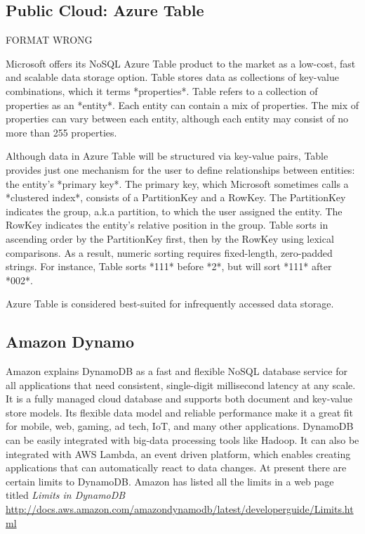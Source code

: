 \subsection{Public Cloud: Azure Table \cv}

     FORMAT WRONG

     Microsoft offers its NoSQL Azure Table product to the market as a
     low-cost, fast and scalable data storage
     option. \cite{www-what-to-use} Table stores data as collections
     of key-value combinations, which it terms *properties*.  Table
     refers to a collection of properties as an *entity*.  Each entity
     can contain a mix of properties.  The mix of properties can vary
     between each entity, although each entity may consist of no more
     than 255 properties. \cite{www-blobqueuetable}

     Although data in Azure Table will be structured via key-value
     pairs, Table provides just one mechanism for the user to define
     relationships between entities: the entity's *primary key*.  The
     primary key, which Microsoft sometimes calls a *clustered index*,
     consists of a PartitionKey and a RowKey.  The PartitionKey
     indicates the group, a.k.a partition, to which the user assigned
     the entity.  The RowKey indicates the entity's relative position
     in the group.  Table sorts in ascending order by the PartitionKey
     first, then by the RowKey using lexical comparisons.  As a
     result, numeric sorting requires fixed-length, zero-padded
     strings.  For instance, Table sorts *111* before *2*, but will
     sort *111* after *002*. \cite{www-scalable-partitioning}

     Azure Table is considered best-suited for infrequently accessed
     data storage.

\subsection{Amazon Dynamo}

     Amazon explains DynamoDB as \cite{www.dyndb} a fast and flexible 
     NoSQL database service for all applications that need consistent, 
     single-digit millisecond latency at any scale. It is a fully managed 
     cloud database and supports both document and key-value store models. 
     Its flexible data model and reliable performance make it a great fit 
     for mobile, web, gaming, ad tech, IoT, and many other applications. 
     DynamoDB can be easily integrated with big-data processing tools like 
     Hadoop. It can also be integrated with AWS Lambda, an event driven platform, 
     which enables creating applications that can automatically react to data 
     changes. At present there are certain limits to DynamoDB. Amazon has listed 
     all the limits in a web page titled \textit{Limits in DynamoDB }
     \url{http://docs.aws.amazon.com/amazondynamodb/latest/developerguide/Limits.html}


